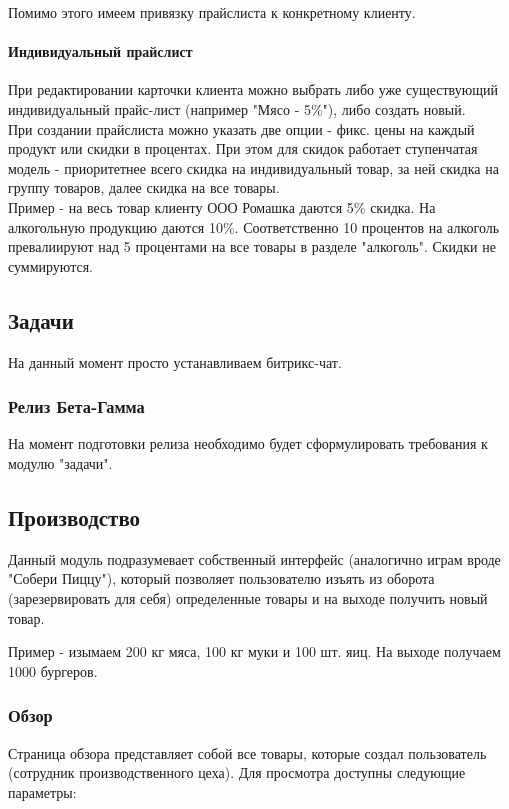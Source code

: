 \documentclass[DIV=calc, paper=a4, fontsize=11pt]{scrartcl} %
\begin{document}
Помимо этого имеем привязку прайслиста к конкретному клиенту.

\paragraph{Индивидуальный прайслист}

При редактировании карточки клиента можно выбрать либо уже существующий индивидуальный прайс-лист (например "Мясо - 5\%"), либо создать новый.
\\[0.5cm]
При создании прайслиста можно указать две опции - фикс. цены на каждый продукт или скидки в процентах. При этом для скидок работает ступенчатая модель - приоритетнее всего скидка на индивидуальный товар, за ней скидка на группу товаров, далее скидка на все товары.
\\[0.5cm]
Пример - на весь товар клиенту ООО Ромашка даются 5\% скидка. На алкогольную продукцию даются 10\%. Соответственно 10 процентов на алкоголь превалиируют над 5 процентами на все товары в разделе "алкоголь". Скидки не суммируются.

\subsection{Задачи}

На данный момент просто устанавливаем битрикс-чат.

\subsubsection{Релиз Бета-Гамма}
На момент подготовки релиза необходимо будет сформулировать требования к модулю "задачи".

\subsection{Производство}

Данный модуль подразумевает собственный интерфейс (аналогично играм вроде "Собери Пиццу"), который позволяет пользователю изъять из оборота (зарезервировать для себя) определенные товары и на выходе получить новый товар.

Пример - изымаем 200 кг мяса, 100 кг муки и 100 шт. яиц. На выходе получаем 1000 бургеров. 

\subsubsection{Обзор}
Страница обзора представляет собой все товары, которые создал пользователь (сотрудник производственного цеха). Для просмотра доступны следующие параметры:
\end{document}
